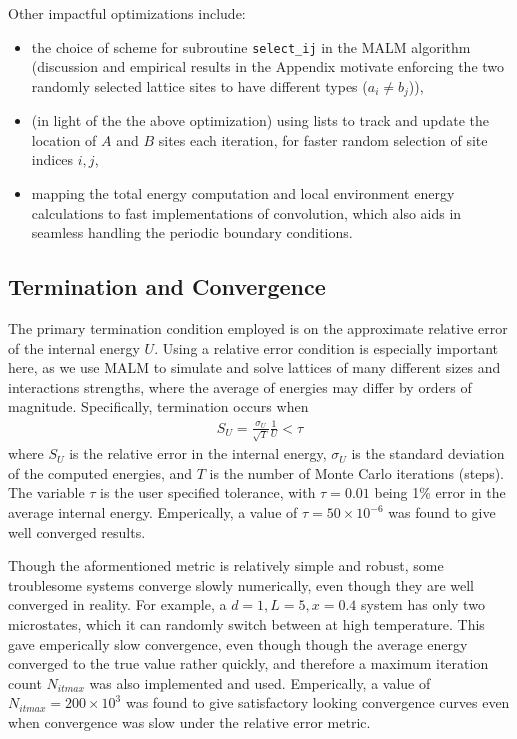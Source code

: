 \documentclass[10pt]{article}
\begin{document}
Other impactful optimizations include:
\begin{itemize}
\item the choice of scheme for subroutine \texttt{select\_ij} in the MALM algorithm (discussion and empirical results in the Appendix motivate enforcing the two randomly selected lattice sites to have different types ($a_i \ne b_j$)),
\item (in light of the the above optimization) using lists to track and update the location of $A$ and $B$ sites each iteration, for faster random selection of site indices $i,j$,
\item  mapping the total energy computation and local environment energy calculations to fast implementations of convolution, which also aids in seamless handling the periodic boundary conditions.
\end{itemize}

\subsection{Termination and Convergence}
The primary termination condition employed is on the approximate relative error of the internal energy $U$.
Using a relative error condition is especially important here, as we use MALM  to simulate and solve lattices of many different sizes and interactions strengths, where the average of energies may differ by orders of magnitude.
Specifically, termination occurs when
\begin{align}
    S_{U} =
    \frac{\sigma_{U}}{\sqrt{T}} \frac{1}{U}
    < \tau
\end{align}
where $S_{U}$ is the relative error in the internal energy, $\sigma_{U}$ is the standard deviation of the computed energies, and $T$ is the number of Monte Carlo iterations (steps).
The variable $\tau$ is the user specified tolerance, with $\tau = 0.01$ being 1\% error in the average internal energy.
Emperically, a value of $\tau = 50 \times 10^{-6}$ was found to give well converged results.

Though the aformentioned metric is relatively simple and robust, some troublesome systems converge slowly numerically, even though they are well converged in reality.
For example, a $d=1, L=5, x=0.4$ system has only two microstates, which it can randomly switch between at high temperature.
This gave emperically slow convergence, even though though the average energy converged to the true value rather quickly, and therefore a maximum iteration count $N_{it max}$ was also implemented and used.
Emperically, a value of $N_{it max} = 200 \times 10^3$ was found to give satisfactory looking convergence curves even when convergence was slow under the relative error metric.
\end{document}
